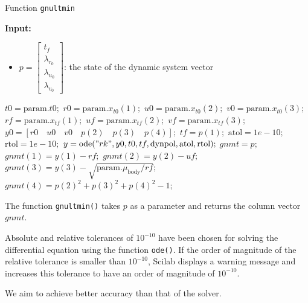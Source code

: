 \documentclass{article}
\begin{document}
	\begin{algorithm}[H]
		\caption{Function \texttt{gnultmin}}
		\begin{algorithmic}
			\State \textbf{Input:}
			\begin{itemize}
				\item $p = \begin{bmatrix} t_f \\ \lambda_{r_0} \\ \lambda_{u_0} \\ \lambda_{v_0} \end{bmatrix}$: the state of the dynamic system vector
			\end{itemize}
			\State $t0 = \text{param}.t0;$
			\State $r0 = \text{param}.x_{t0}(1);$
			\State $u0 = \text{param}.x_{t0}(2);$
			\State $v0 = \text{param}.x_{t0}(3);$
			\State $rf = \text{param}.x_{tf}(1);$
			\State $uf = \text{param}.x_{tf}(2);$
			\State $vf = \text{param}.x_{tf}(3);$
			\State $y0 = [r0 \quad u0 \quad v0 \quad p(2) \quad p(3) \quad p(4)];$
			\State $tf = p(1);$
			\State $\text{atol} = 1e-10;$
			\State $\text{rtol} = 1e-10;$
			\State $y = \text{ode}("rk", y0, t0, tf, \text{dynpol}, \text{atol}, \text{rtol});$
			\State $gnmt = p;$
			\State $gnmt(1) = y(1) - rf;$
			\State $gnmt(2) = y(2) - uf;$
			\State $gnmt(3) = y(3) - \sqrt{\text{param}.\mu_{\text{body}} / rf};$
			\State $gnmt(4) = p(2)^2 + p(3)^2 + p(4)^2 - 1;$
			\EndFunction
		\end{algorithmic}
	\end{algorithm}
	
	The function \texttt{gnultmin()} takes \( p \) as a parameter and returns the column vector \( gnmt \).
	
	Absolute and relative tolerances of \( 10^{-10} \) have been chosen for solving the differential equation using the function \texttt{ode()}. If the order of magnitude of the relative tolerance is smaller than \( 10^{-10} \), Scilab displays a warning message and increases this tolerance to have an order of magnitude of \( 10^{-10} \).
	
	We aim to achieve better accuracy than that of the solver.
	
\end{document}
